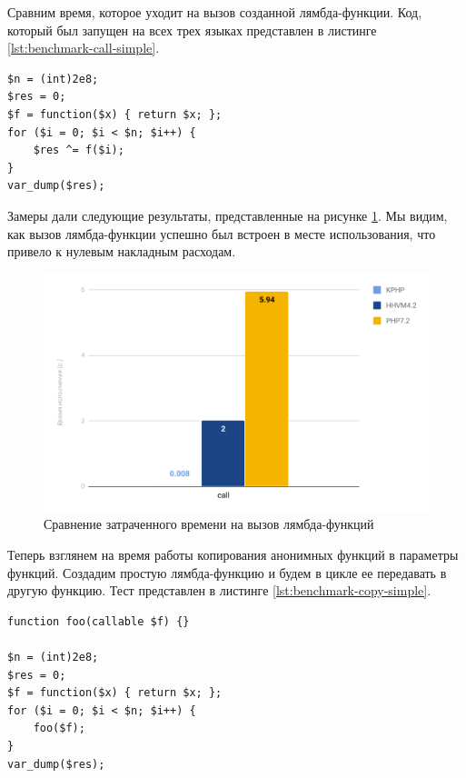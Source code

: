 Сравним время, которое уходит на вызов созданной лямбда-функции.
Код, который был запущен на всех трех языках представлен в листинге \ref{lst:benchmark-call-simple}.
\begin{lstlisting}[caption={Бенчмарк вызовов анонимных функций},label={lst:benchmark-call-simple}]
$n = (int)2e8;
$res = 0;
$f = function($x) { return $x; };
for ($i = 0; $i < $n; $i++) {
    $res ^= f($i);
}
var_dump($res);
\end{lstlisting}

Замеры дали следующие результаты, представленные на рисунке \ref{fig:benchmark-call-simple}.
Мы видим, как вызов лямбда-функции успешно был встроен в месте использования, что привело к нулевым накладным расходам.
\begin{figure}[H]
    \caption{Сравнение затраченного времени на вызов лямбда-функций}
    \label{fig:benchmark-call-simple}
    \centering
    \includegraphics[width=\linewidth]{images/benchmark_call_simple}
\end{figure}

Теперь взглянем на время работы копирования анонимных функций в параметры функций.
Создадим простую лямбда-функцию и будем в цикле ее передавать в другую функцию.
Тест представлен в листинге \ref{lst:benchmark-copy-simple}.
\begin{lstlisting}[caption={Бенчмарк копирования анонимных функций},label={lst:benchmark-copy-simple}]
function foo(callable $f) {}

$n = (int)2e8;
$res = 0;
$f = function($x) { return $x; };
for ($i = 0; $i < $n; $i++) {
    foo($f);
}
var_dump($res);
\end{lstlisting}

